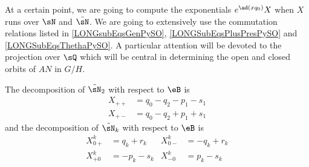 At a certain point, we are going to compute the exponentials $ e^{\ad(xq_0)}X$ when $X$ runs over $\sN$ and $\bar\sN$. We are going to extensively use the commutation relations listed in \eqref{LONGsubEqsGenPySO}, \eqref{LONGSubEqsPlusPresPySO} and \eqref{LONGSubEqsThethaPySO}. A particular attention will be devoted to the projection over $\sQ$ which will be central in determining the open and closed orbits of $AN$ in $G/H$.

\begin{lemma}		\label{LONGLemDecomptsNDanseB}
	The decomposition of $\tilde\sN_2$ with respect to $\eB$ is
	\begin{subequations}		\label{LONGSubeqsDecompXqps}
		\begin{align}
			X_{++} & =q_0-q_2-p_1-s_1 \\
			X_{+-} & =q_0-q_2+p_1+s_1
		\end{align}
	\end{subequations}
	and the decomposition of $\tilde\sN_k$ with respect to $\eB$ is
	\begin{subequations}
		\begin{align}
			X_{0+}^k & = q_k+r_k  & X_{0-}^k & =-q_k+r_k		\label{LONGsubEqqrkXzpegal} \\
			X_{+0}^k & = -p_k-s_k & X_{-0}^k & = p_k-s_k
		\end{align}
	\end{subequations}

\end{lemma}

